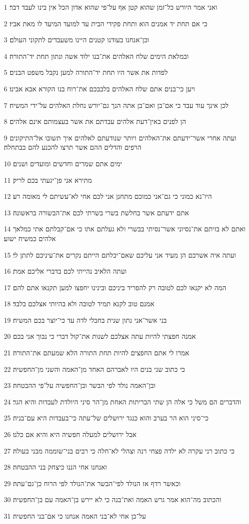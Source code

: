 \par 1 ואני אמר היורש כל־זמן שהוא קטן אף על־פי שהוא אדון הכל אין בינו לעבד דבר׃
\par 2 כי אם תחת יד אמנים הוא ותחת פקידי הבית עד למועד המיעד לו מאת אביו׃
\par 3 וכן־אנחנו בעודנו קטנים היינו משעבדים לתקוני העולם׃
\par 4 ובמלאת הימים שלח האלהים את־בנו ילוד אשה ונתון תחת יד־התורה׃
\par 5 לפדות את אשר היו תחת יד־התורה למען נקבל משפט הבנים׃
\par 6 ויען כי־בנים אתם שלח האלהים בלבבכם את־רוח בנו הקורא אבא אבינו׃
\par 7 לכן אינך עוד עבד כי אם־בן ואם־בן אתה הנך גם־יורש נחלת האלהים על־ידי המשיח׃
\par 8 הן לפנים באין־דעת אלהים עבדתם את אשר בעצמותם אינם אלהים׃
\par 9 ועתה אחרי אשר־ידעתם את־האלהים ויותר שנודעתם לאלהים איך תשובו אל־התיקונים הרפים והדלים ההם אשר תרצו להכנע להם כבתחלה׃
\par 10 ימים אתם שמרים וחדשים ומועדים ושנים׃
\par 11 מתירא אני פן־יגעתי בכם לריק׃
\par 12 היו־נא כמוני כי גם־אני כמוכם מתחנן אני לכם אחי לא־עשיתם לי מאומה רע׃
\par 13 אתם ידעתם אשר בחלשת בשרי בשרתי לכם את־הבשורה בראשונה׃
\par 14 ואתם לא בזיתם את־נסיוני אשר־נסיתי בבשרי ולא געלתם אתו כי אם־קבלתם אתי כמלאך אלהים כמשיח ישוע׃
\par 15 ועתה איה אשרכם הן מעיד אני עליכם שאם־יכלתם הייתם נקרים את־עיניכם לתתן לי׃
\par 16 ועתה הלאיב נהייתי לכם בדברי אליכם אמת׃
\par 17 המה לא יקנאו לכם לטובה רק להפריד ביניכם ובינינו יחפצו למען תקנאו אתם להם׃
\par 18 אמנם טוב לקנא תמיד לטובה ולא בהיותי אצלכם בלבד׃
\par 19 בני אשר־אני נתון שנית בחבלי לדה עד כי־יוצר בכם המשיח׃
\par 20 אמנה חפצתי להיות עתה אצלכם לשנות את־קול דברי כי נבוך אני בכם׃
\par 21 אמרו לי אתם החפצים להיות תחת התורה הלא שמעתם את־התורה׃
\par 22 כי כתוב שני בנים היו לאברהם האחד מן־האמה והשני מן־החפשיה׃
\par 23 ובן־האמה נולד לפי הבשר ובן־החפשיה על־פי ההבטחה׃
\par 24 והדברים הם משל כי אלה הן שתי הבריתות האחת מן־הר סיני היולדת לעבדות והיא הגר׃
\par 25 כי־סיני הוא הר בערב והוא כנגד ירושלים של־עתה כי־בעבדות היא עם־בניה׃
\par 26 אבל ירושלים למעלה חפשיה היא והיא אם כלנו׃
\par 27 כי כתוב רני עקרה לא ילדה פצחי רנה וצהלי לא־חלה כי רבים בני־שוממה מבני בעולה׃
\par 28 ואנחנו אחי הננו כיצחק בני ההבטחה׃
\par 29 וכאשר רדף אז הנולד לפי־הבשר את־הנולד לפי הרוח כן־גם־עתה׃
\par 30 והכתוב מה־הוא אמר גרש האמה ואת־בנה כי לא יירש בן־האמה עם בן־החפשיה׃
\par 31 על־כן אחי לא־בני האמה אנחנו כי אם־בני החפשיה׃

